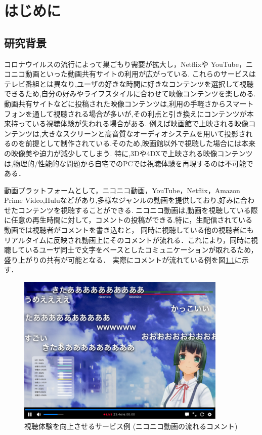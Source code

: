\chapter{はじめに}
\thispagestyle{myheadings}

\section{研究背景}
コロナウイルスの流行によって巣ごもり需要が拡大し，Netflixや YouTube，ニコニコ動画といった動画共有サイトの利用が広がっている.
これらのサービスはテレビ番組とは異なり,ユーザの好きな時間に好きなコンテンツを選択して視聴できるため,自分の好みやライフスタイルに合わせて映像コンテンツを楽しめる.
動画共有サイトなどに投稿された映像コンテンツは,利用の手軽さからスマートフォンを通して視聴される場合が多いが,その利点と引き換えにコンテンツが本来持っている視聴体験が失われる場合がある.
例えば映画館で上映される映像コンテンツは,大きなスクリーンと高音質なオーディオシステムを用いて投影されるのを前提として制作されている.そのため,映画館以外で視聴した場合には本来の映像美や迫力が減少してしまう.
特に,3Dや4DXで上映される映像コンテンツは,物理的/性能的な問題から自宅でのPCでは視聴体験を再現するのは不可能である．

動画プラットフォームとして，ニコニコ動画，YouTube，Netflix，Amazon Prime Video,Huluなどがあり,多様なジャンルの動画を提供しており,好みに合わせたコンテンツを視聴することができる.
ニコニコ動画は,動画を視聴している際に任意の再生時間に対して，コメントの投稿ができる.特に，生配信されている動画では視聴者がコメントを書き込むと，
同時に視聴している他の視聴者にもリアルタイムに反映され動画上にそのコメントが流れる．これにより，同時に視聴しているユーザ同士で文字をベースとしたコミュニケーションが取れるため，盛り上がりの共有が可能となる．
実際にコメントが流れている例を図\ref{nikoniko}に示す．

\begin{figure}[H]
    \centering
    \includegraphics[width=10cm]{images/chapter1/nikoniko_grafu.png}
    \caption{視聴体験を向上させるサービス例 (ニコニコ動画の流れるコメント)}
    \label{nikoniko}
\end{figure}

